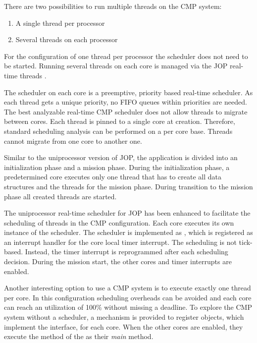 
There are two possibilities to run multiple threads on the CMP
system:

\begin{enumerate}
  \item A single thread per processor
  \item Several threads on each processor
\end{enumerate}

For the configuration of one thread per processor the scheduler does
not need to be started. Running several threads on each core is
managed via the JOP real-time threads .

The scheduler on each core is a preemptive, priority based real-time
scheduler. As each thread gets a unique priority, no FIFO queues
within priorities are needed. The best analyzable real-time CMP
scheduler does not allow threads to migrate between cores. Each
thread is pinned to a single core at creation. Therefore, standard
scheduling analysis can be performed on a per core base. Threads
cannot migrate from one core to another one.

Similar to the uniprocessor version of JOP, the application is
divided into an initialization phase and a mission phase. During the
initialization phase, a predetermined core executes only one thread
that has to create all data structures and the threads for the
mission phase. During transition to the mission phase all created
threads are started.

The uniprocessor real-time scheduler for JOP has been enhanced to
facilitate the scheduling of threads in the CMP configuration. Each
core executes its own instance of the scheduler. The scheduler is
implemented as , which is registered as an interrupt
handler for the core local timer interrupt. The scheduling is not
tick-based. Instead, the timer interrupt is reprogrammed after each
scheduling decision. During the mission start, the other cores and
timer interrupts are enabled.

Another interesting option to use a CMP system is to execute exactly
one thread per core. In this configuration scheduling overheads can
be avoided and each core can reach an utilization of 100\% without
missing a deadline. To explore the CMP system without a scheduler, a
mechanism is provided to register objects, which implement the
 interface, for each core. When the other cores are
enabled, they execute the  method of the  as
their \emph{main} method.


